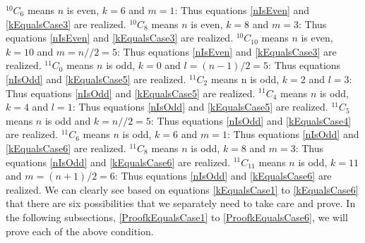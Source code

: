 \documentclass[10pt, twoside]{article}
\newcommand*{\Combination}[2]{{}^{#1}C_{#2}}%
\begin{document}
$\Combination{10}{6}$ means $n$ is even, $k = 6$ and $m=1$: Thus equations \eqref{nIsEven} and \eqref{kEqualsCase3} are realized.\newline
$\Combination{10}{8}$ means $n$ is even, $k = 8$ and $m=3$: Thus equations \eqref{nIsEven} and \eqref{kEqualsCase3} are realized.\newline
$\Combination{10}{10}$ means $n$ is even, $k = 10$ and $m= n//2=5$: Thus equations \eqref{nIsEven} and \eqref{kEqualsCase3} are realized.\newline\newline
$\Combination{11}{0}$ means $n$ is odd, $k = 0$ and $l=(n-1)/2=5$: Thus equations \eqref{nIsOdd} and \eqref{kEqualsCase5} are realized.\newline
$\Combination{11}{2}$ means n is odd, $k = 2$ and $l=3$: Thus equations \eqref{nIsOdd} and \eqref{kEqualsCase5} are realized.\newline
$\Combination{11}{4}$ means $n$ is odd, $k = 4$ and $l=1$: Thus equations \eqref{nIsOdd} and \eqref{kEqualsCase5} are realized.\newline\newline
$\Combination{11}{5}$ means $n$ is odd and $k = n//2 = 5$: Thus equations \eqref{nIsOdd} and \eqref{kEqualsCase4} are realized.\newline\newline
$\Combination{11}{6}$ means $n$ is odd, $k = 6$ and $m=1$: Thus equations \eqref{nIsOdd} and \eqref{kEqualsCase6} are realized.\newline
$\Combination{11}{8}$ means $n$ is odd, $k = 8$ and $m=3$: Thus equations \eqref{nIsOdd} and \eqref{kEqualsCase6} are realized.\newline
$\Combination{11}{11}$ means $n$ is odd, $k = 11$ and $m= (n+1)/2=6$: Thus equations \eqref{nIsOdd} and \eqref{kEqualsCase6} are realized.\newline\newline
We can clearly see based on equations \eqref{kEqualsCase1} to \eqref{kEqualsCase6} that there are six possibilities that we separately need to take care and prove. In the following subsections, \ref{ProofkEqualsCase1} to \ref{ProofkEqualsCase6}, we will prove each of the above condition.
\end{document}

